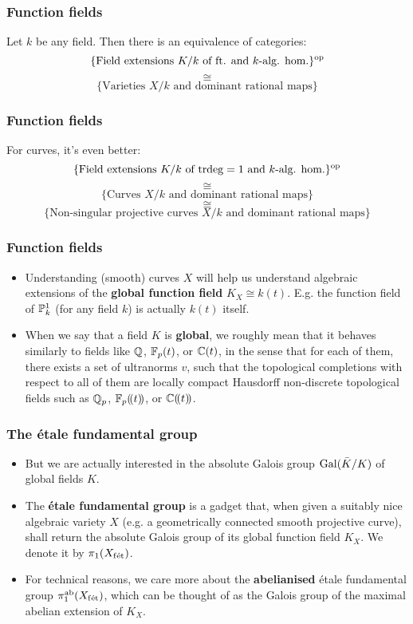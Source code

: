 \documentclass{beamer}
\begin{document}
    \begin{frame}
        \frametitle{Function fields}
        
        Let $k$ be any field. Then there is an equivalence of categories:
            $$\{\text{Field extensions $K/k$ of ft. and $k$-alg. hom.}\}^{\op}$$
            $$\cong$$
            $$\{\text{Varieties $X/k$ and dominant rational maps}\}$$
    \end{frame}
    
    \begin{frame}
        \frametitle{Function fields}
        
        For curves, it's even better:
            $$\{\text{Field extensions $K/k$ of $\trdeg = 1$ and $k$-alg. hom.}\}^{\op}$$
            $$\cong$$
            $$\{\text{Curves $X/k$ and dominant rational maps}\}$$
            $$\cong$$
            $$\{\text{Non-singular projective curves $X/k$ and dominant rational maps}\}$$
    \end{frame}
    
    \begin{frame}
        \frametitle{Function fields}
        
        \begin{itemize}
            \item Understanding (smooth) curves $X$ will help us understand algebraic extensions of the \textbf{global function field} $K_X \cong k(t)$. E.g. the function field of $\P^1_k$ (for any field $k$) is actually $k(t)$ itself.
            \item When we say that a field $K$ is \textbf{global}, we roughly mean that it behaves similarly to fields like $\Q$, $\F_p(t)$, or $\bbC(t)$, in the sense that for each of them, there exists a set of ultranorms $v$, such that the topological completions with respect to all of them are locally compact Hausdorff non-discrete topological fields such as $\Q_p$, $\F_p(\!(t)\!)$, or $\bbC(\!(t)\!)$.
        \end{itemize}
    \end{frame}
    
    \begin{frame}
        \frametitle{The \'etale fundamental group}
        
        \begin{itemize}
            \item But we are actually interested in the absolute Galois group $\Gal(\bar{K}/K)$ of global fields $K$. 
            \item The \textbf{\'etale fundamental group} is a gadget that, when given a suitably nice algebraic variety $X$ (e.g. a geometrically connected smooth projective curve), shall return the absolute Galois group of its global function field $K_X$. We denote it by $\pi_1(X_{\fet})$.
            \item For technical reasons, we care more about the \textbf{abelianised} \'etale fundamental group $\pi_1^{\ab}(X_{\fet})$, which can be thought of as the Galois group of the maximal abelian extension of $K_X$.
        \end{itemize}
    \end{frame}
    
\end{document}
